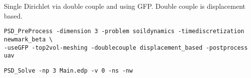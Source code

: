 \newcommand{\psd}[1]{{\small\sffamily{\color{blue!60}#1}}}


Single Dirichlet via double couple and using GFP. Double couple is
displacement based.

\begin{lstlisting}[style=BashInputStyle]
PSD_PreProcess -dimension 3 -problem soildynamics -timediscretization newmark_beta \
-useGFP -top2vol-meshing -doublecouple displacement_based -postprocess uav
\end{lstlisting}

\begin{lstlisting}[style=BashInputStyle]
PSD_Solve -np 3 Main.edp -v 0 -ns -nw 
\end{lstlisting}
